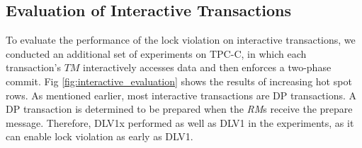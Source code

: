 \documentclass[conference]{IEEEtran}
\begin{document}
\subsection{Evaluation of Interactive Transactions}


To evaluate the performance of the lock violation on interactive transactions,
we conducted an additional set of experiments on TPC-C, in which each transaction's ${TM}$ interactively accesses data and then enforces a two-phase commit.
Fig \ref{fig:interactive_evaluation} shows the results of increasing hot spot rows.
As mentioned earlier, most interactive transactions are DP transactions.
A DP transaction is determined to be prepared when the \emph{RM}s receive the prepare message.
Therefore, DLV1x performed as well as DLV1 in the experiments, as it can enable lock violation as early as DLV1.
\end{document}
